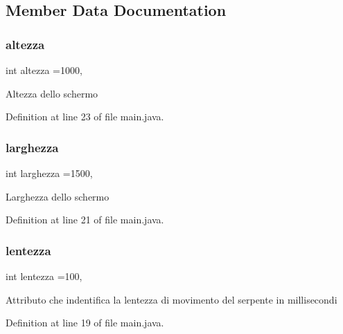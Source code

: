 \subsection{Member Data Documentation}
\mbox{\label{classmain_a7f1f35801399ed3e36906a1e6f99eb49}} 
\subsubsection{\texorpdfstring{altezza}{altezza}}
{\footnotesize\ttfamily int altezza =1000\hspace{0.3cm}{\ttfamily [static]}, {\ttfamily [private]}}

Altezza dello schermo 

Definition at line 23 of file main.\+java.

\mbox{\label{classmain_ad41dcd7160c56278e318dd1e98c2427c}} 
\subsubsection{\texorpdfstring{larghezza}{larghezza}}
{\footnotesize\ttfamily int larghezza =1500\hspace{0.3cm}{\ttfamily [static]}, {\ttfamily [private]}}

Larghezza dello schermo 

Definition at line 21 of file main.\+java.

\mbox{\label{classmain_a4f5efe2a0b2711ad1b63143c5ce94bcd}} 
\subsubsection{\texorpdfstring{lentezza}{lentezza}}
{\footnotesize\ttfamily int lentezza =100\hspace{0.3cm}{\ttfamily [static]}, {\ttfamily [private]}}

Attributo che indentifica la lentezza di movimento del serpente in millisecondi 

Definition at line 19 of file main.\+java.

\mbox{\label{classmain_a23cfb877f1f20af97a29e6f61424aa80}} 
